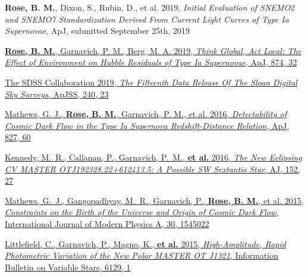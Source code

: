 \documentclass[margin]{res}
\begin{document}
\begin{resume}

\hangindent=15pt
{\bf Rose, B. M.}, Dixon, S., Rubin, D., et al.  2019, {\sl Initial Evaluation of SNEMO2 and SNEMO7 Standardization Derived From Current Light Curves of Type Ia Supernovae}, ApJ, submitted September 25th, 2019%
\vspace{-12pt}

\hangindent=15pt 
\href{https://ui.adsabs.harvard.edu/#abs/2019arXiv190201433R/abstract}{{\bf Rose, B. M.}, Garnavich, P. M., Berg, M. A. 2019, {\sl Think Global, Act Local: The Effect of Environment on Hubble Residuals of Type Ia Supernovae}, ApJ, 874, 32}
\vspace{-12pt}

\hangindent=15pt 
\href{https://ui.adsabs.harvard.edu/#abs/2018arXiv181202759A/abstract}{The SDSS Collaboration 2019, {\sl The Fifteenth Data Release Of The Sloan Digital Sky Surveys}, ApJSS, 240, 23}
\vspace{-12pt}

\hangindent=15pt 
\href{https://ui.adsabs.harvard.edu/#abs/2016ApJ...827...60M/abstract}{Mathews, G. J., {\bf Rose, B. M.}, Garnavich, P. M., et al. 2016, {\sl Detectability of Cosmic Dark Flow in the Type Ia Supernova Redshift-Distance Relation}, ApJ, 827, 60}

\vspace{-12pt}
\hangindent=15pt 
\href{https://ui.adsabs.harvard.edu/#abs/2016AJ....152...27K/abstract}{Kennedy, M.~R., Callanan, P., Garnavich, P.~M., {\bf et al.} 2016, {\sl The New Eclipsing CV MASTER OTJ192328.22+612413.5: A Possible SW Sextantis Star}, AJ, 152, 27}

\vspace{-12pt}
\hangindent=15pt 
\href{https://ui.adsabs.harvard.edu/#abs/2015IJMPA..3045022M/abstract}{Mathews, G.~J., Gangopadhyay, M.~R., Garnavich, P., {\bf Rose, B. M.}, et al. 2015, {\sl Constraints on the Birth of the Universe and Origin of Cosmic Dark Flow}, International Journal of Modern Physics A, 30, 1545022}

\vspace{-12pt}
\hangindent=15pt 
\href{https://ui.adsabs.harvard.edu/#abs/2015IBVS.6129....1L/abstract}{Littlefield, C., Garnavich, P., Magno, K., {\bf et al.} 2015, {\sl High-Amplitude, Rapid Photometric Variation of the New Polar MASTER OT J1321}, Information Bulletin on Variable Stars, 6129, 1}





\end{resume}
\end{document}
